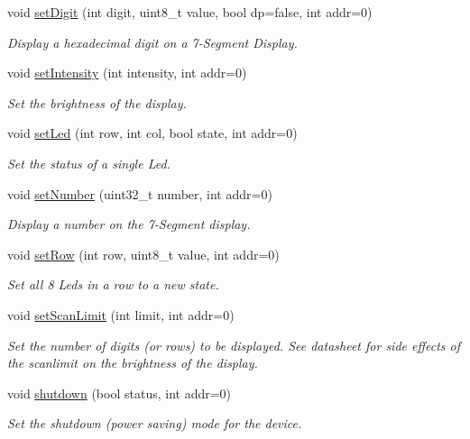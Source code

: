 \begin{DoxyCompactItemize}
void \hyperlink{class_m_a_x7219_aa4f94d965ecde62d2dd8a4091005b0a0}{set\+Digit} (int digit, uint8\+\_\+t value, bool dp=false, int addr=0)
\begin{DoxyCompactList}\small\item\em Display a hexadecimal digit on a 7-\/\+Segment Display. \end{DoxyCompactList}\item 
void \hyperlink{class_m_a_x7219_a204133a6b253f5d519acd5dc0077f32a}{set\+Intensity} (int intensity, int addr=0)
\begin{DoxyCompactList}\small\item\em Set the brightness of the display. \end{DoxyCompactList}\item 
void \hyperlink{class_m_a_x7219_aebc8bfad65290b1b4580688c719f7e13}{set\+Led} (int row, int col, bool state, int addr=0)
\begin{DoxyCompactList}\small\item\em Set the status of a single Led. \end{DoxyCompactList}\item 
void \hyperlink{class_m_a_x7219_a1e50065060426b3433ec16ea2e304760}{set\+Number} (uint32\+\_\+t number, int addr=0)
\begin{DoxyCompactList}\small\item\em Display a number on the 7-\/\+Segment display. \end{DoxyCompactList}\item 
void \hyperlink{class_m_a_x7219_aecd0b20a63757fd74e849369dd797e74}{set\+Row} (int row, uint8\+\_\+t value, int addr=0)
\begin{DoxyCompactList}\small\item\em Set all 8 Led\textquotesingle{}s in a row to a new state. \end{DoxyCompactList}\item 
void \hyperlink{class_m_a_x7219_a14cd47938ff60879b676d9a0c02d4268}{set\+Scan\+Limit} (int limit, int addr=0)
\begin{DoxyCompactList}\small\item\em Set the number of digits (or rows) to be displayed. See datasheet for side effects of the scanlimit on the brightness of the display. \end{DoxyCompactList}\item 
void \hyperlink{class_m_a_x7219_a948326a74baa10f8fead88c7b04a21b1}{shutdown} (bool status, int addr=0)
\begin{DoxyCompactList}\small\item\em Set the shutdown (power saving) mode for the device. \end{DoxyCompactList}\end{DoxyCompactItemize}


